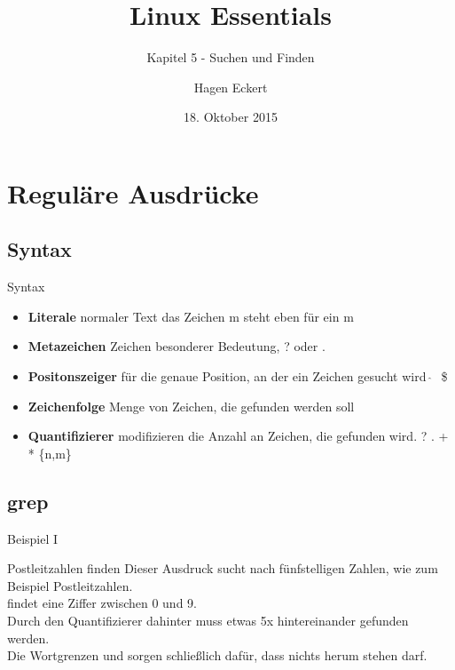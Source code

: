 \documentclass[aspectratio=43]{beamer}
\title[Linux Essentials  - Kapitel 5 - Suchen und Finden]{Linux Essentials}
\subtitle{Kapitel 5 - Suchen und Finden}
\author{Hagen Eckert}
\date{18. Oktober 2015}
\begin{document}
\logoframe

\frame{\titlepage}

\setcounter{tocdepth}{1}
\section[Gliederung]{}
\frame{\tableofcontents}

\section{Reguläre Ausdrücke}
\subsection{Syntax}
\begin{frame} 
	\begin{block}{Syntax} 
	\begin{itemize}
	\item \textbf{Literale} normaler Text
	\newline  das Zeichen m steht eben für ein m 
	\item \textbf{Metazeichen} Zeichen besonderer Bedeutung, 
	\newline ? oder .
	\item \textbf{Positonszeiger} für die genaue Position, an der ein Zeichen gesucht wird
	\newline  $\hat{\;}\;$ \$
	\item \textbf{Zeichenfolge} Menge von Zeichen, die gefunden werden soll
	\item \textbf{Quantifizierer} modifizieren die Anzahl an Zeichen, die gefunden wird.
	\newline  ? . + * \{n,m\}
	\end{itemize}
	\end{block}


\end{frame}


\subsection{grep}
\begin{frame} 
	\begin{exampleblock}{Beispiel I}
	\end{exampleblock}

	\begin{block}{Postleitzahlen finden} 
Dieser Ausdruck sucht nach fünfstelligen Zahlen, wie zum Beispiel Postleitzahlen. \\
\co{[0-­9]} findet eine Ziffer zwischen 0 und 9. \\
Durch den Quantifizierer  dahinter muss etwas 5x hintereinander gefunden werden. \\
Die Wortgrenzen \co{\textbackslash$<$} und \co{\textbackslash$>$} sorgen schließlich dafür, dass nichts herum stehen darf.
	\end{block}	
\end{frame}
\end{document}
